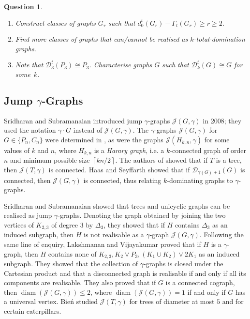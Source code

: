 \documentclass[12pt]{article}%
\newtheorem{question}{Question}[section]
\begin{document}
\begin{question}
\emph{\cite{26CM-AFM}}


\begin{enumerate}
\item[$(i)$] Construct classes of graphs $G_{r}$ such that $d_{0}^{t}%
(G_{r})-\Gamma_{t}(G_{r})\geq r\geq2$.

\item[$(ii)$] Find more classes of graphs that can/cannot be realised as
$k$-total-domination graphs.

\item[$(iii)$] Note that $\mathcal{D}_{3}^{t}(P_{3})\cong P_{3}$. Characterise
graphs $G$ such that $\mathcal{D}_{k}^{t}(G)\cong G$ for some~$k$.
\end{enumerate}
\end{question}

\subsection{Jump $\gamma$-Graphs}

\label{SecJump}Sridharan and Subramanaian \cite{26CM-Sub} introduced jump
$\gamma$-graphs $\mathcal{J}(G,\gamma)$ in 2008; they used the notation
$\gamma\cdot G$ instead of $\mathcal{J}(G,\gamma)$. The $\gamma$-graphs
$\mathcal{J}(G,\gamma)$ for $G\in\{P_{n},C_{n}\}$ were determined in
\cite{26CM-Sub}, as were the graphs $\mathcal{J}(H_{k,n},\gamma)$ for some
values of $k$ and $n$, where $H_{k,n}$ is a \emph{Harary graph}, i.e. a
$k$-connected graph of order $n$ and minimum possible size $\left\lceil
kn/2\right\rceil $. The authors of \cite{26CM-Sub} showed that if $T$ is a
tree, then $\mathcal{J}(T,\gamma)$ is connected. Haas and Seyffarth
\cite{26CM-HS2014} showed that if $\mathcal{D}_{\gamma(G)+1}(G)$ is connected,
then $\mathcal{J}(G,\gamma)$ is connected, thus relating $k$-dominating graphs
to $\gamma$-graphs.

Sridharan and Subramanaian \cite{26CM-Srid} showed that trees and unicyclic
graphs can be realised as jump $\gamma$-graphs. Denoting the graph obtained by
joining the two vertices of $K_{2,3}$ of degree $3$ by $\Delta_{3}$, they
showed that if $H$ contains $\Delta_{3}$ as an induced subgraph, then $H$ is
not realisable as a $\gamma$-graph $\mathcal{J}(G,\gamma)$. Following the same
line of enquiry, Lakshmanan and Vijayakumar \cite{26CM-LV} proved that if $H$
is a $\gamma$-graph, then $H$ contains none of $K_{2,3},K_{2}\vee P_{3}%
,(K_{1}\cup K_{2})\vee2K_{1}$ as an induced subgraph. They showed that the
collection of $\gamma$-graphs is closed under the Cartesian product and that a
disconnected graph is realisable if and only if all its components are
realisable. They also proved that if $G$ is a connected cograph, then
$\operatorname{diam}(\mathcal{J}(G,\gamma))\leq2$, where $\operatorname{diam}%
(\mathcal{J}(G,\gamma))=1$ if and only if $G$ has a universal vertex. Bie\'{n}
\cite{26CM-Bien} studied $\mathcal{J}(T,\gamma)$ for trees of diameter at most
$5$ and for certain caterpillars.
\end{document}
